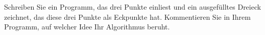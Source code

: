 %
Schreiben Sie ein Programm, das drei Punkte einliest und ein 
ausgefülltes Dreieck zeichnet, das diese drei Punkte als Eckpunkte hat. 
Kommentieren Sie in Ihrem Programm, auf welcher Idee Ihr Algorithmus 
beruht.
